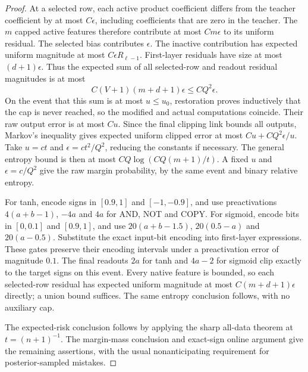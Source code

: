\begin{proof}
At a selected row, each active product coefficient differs from the teacher coefficient by at most $C\epsilon$, including coefficients that are zero in the teacher. The $m$ capped active features therefore contribute at most $C m\epsilon$ to its uniform residual. The selected bias contributes $\epsilon$. The inactive contribution has expected uniform magnitude at most $C\epsilon R_{\ell-1}$. First-layer residuals have size at most $(d+1)\epsilon$. Thus the expected sum of all selected-row and readout residual magnitudes is at most
\[
 C(V+1)(m+d+1)\epsilon\le C Q^2\epsilon.
\]
On the event that this sum is at most $u\le u_0$, restoration proves inductively that the cap is never reached, so the modified and actual computations coincide. Their raw output error is at most $Cu$. Since the final clipping link bounds all outputs, Markov's inequality gives expected uniform clipped error at most
$Cu+C Q^2\epsilon/u$. Take $u=ct$ and $\epsilon=c t^2/Q^2$, reducing the constants if necessary. The general entropy bound is then at most $C Q\log(CQ(m+1)/t)$. A fixed $u$ and $\epsilon=c/Q^2$ give the raw margin probability, by the same event and binary relative entropy.

For tanh, encode signs in $[0.9,1]$ and $[-1,-0.9]$, and use preactivations $4(a+b-1)$, $-4a$ and $4a$ for AND, NOT and COPY. For sigmoid, encode bits in $[0,0.1]$ and $[0.9,1]$, and use $20(a+b-1.5)$, $20(0.5-a)$ and $20(a-0.5)$. Substitute the exact input-bit encoding into first-layer expressions. These gates preserve their encoding intervals under a preactivation error of magnitude $0.1$. The final readouts $2a$ for tanh and $4a-2$ for sigmoid clip exactly to the target signs on this event. Every native feature is bounded, so each selected-row residual has expected uniform magnitude at most $C(m+d+1)\epsilon$ directly; a union bound suffices. The same entropy conclusion follows, with no auxiliary cap.

The expected-risk conclusion follows by applying the sharp all-data theorem at $t=(n+1)^{-1}$. The margin-mass conclusion and exact-sign online argument give the remaining assertions, with the usual nonanticipating requirement for posterior-sampled mistakes.
\end{proof}
